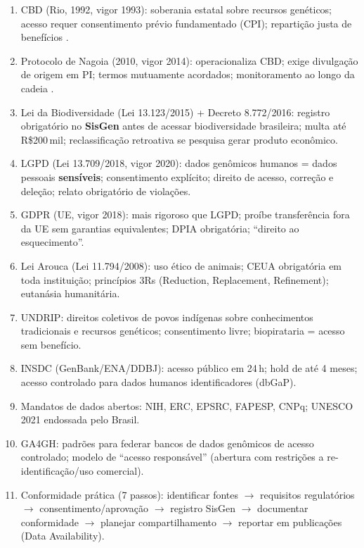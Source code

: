 \clearpage
\begin{revise}
\begin{enumerate}
    \item CBD (Rio, 1992, vigor 1993): soberania estatal sobre recursos genéticos; acesso requer consentimento prévio fundamentado (CPI); repartição justa de benefícios \parencite{cbd1992}.
    \item Protocolo de Nagoia (2010, vigor 2014): operacionaliza CBD; exige divulgação de origem em PI; termos mutuamente acordados; monitoramento ao longo da cadeia \parencite{nagoyaprotocol2014}.
    \item Lei da Biodiversidade (Lei 13.123/2015) + Decreto 8.772/2016: registro obrigatório no \textbf{SisGen} antes de acessar biodiversidade brasileira; multa até R\$200\,mil; reclassificação retroativa se pesquisa gerar produto econômico.
    \item LGPD (Lei 13.709/2018, vigor 2020): dados genômicos humanos = dados pessoais \textbf{sensíveis}; consentimento explícito; direito de acesso, correção e deleção; relato obrigatório de violações.
    \item GDPR (UE, vigor 2018): mais rigoroso que LGPD; proíbe transferência fora da UE sem garantias equivalentes; DPIA obrigatória; ``direito ao esquecimento''.
    \item Lei Arouca (Lei 11.794/2008): uso ético de animais; CEUA obrigatória em toda instituição; princípios 3Rs (Reduction, Replacement, Refinement); eutanásia humanitária.
    \item UNDRIP: direitos coletivos de povos indígenas sobre conhecimentos tradicionais e recursos genéticos; consentimento livre; biopirataria = acesso sem benefício.
    \item INSDC (GenBank/ENA/DDBJ): acesso público em 24\,h; hold de até 4 meses; acesso controlado para dados humanos identificadores (dbGaP).
    \item Mandatos de dados abertos: NIH, ERC, EPSRC, FAPESP, CNPq; UNESCO 2021 endossada pelo Brasil.
    \item GA4GH: padrões para federar bancos de dados genômicos de acesso controlado; modelo de ``acesso responsável'' (abertura com restrições a re-identificação/uso comercial).
    \item Conformidade prática (7 passos): identificar fontes $\to$ requisitos regulatórios $\to$ consentimento/aprovação $\to$ registro SisGen $\to$ documentar conformidade $\to$ planejar compartilhamento $\to$ reportar em publicações (Data Availability).
\end{enumerate}
\end{revise}

\clearpage

\printbibliography[heading=subbibliography,title={Referências}]

